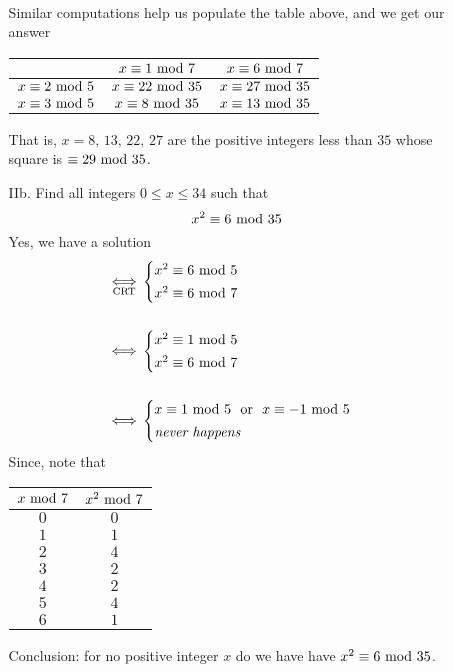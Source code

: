 \begin{itemize}[leftmargin=2em, itemsep=1.5em]
\begin{itemize}[leftmargin=*,itemsep=1.5em]
\\
Similar computations help us populate the table above, and we get our answer
\begin{center}
\begin{tabular}{|c|c|c|}
\hline
&$x\equiv 1\text{ mod }{7}$&$x\equiv 6\text{ mod }{7}$\\
\hline
$x\equiv 2\text{ mod }{5}$ & $x \equiv 22\text{ mod }{35}$& $x \equiv 27\text{ mod }{35}$\\
\hline
$x\equiv 3\text{ mod }{5}$ & $x \equiv 8\text{ mod }{35}$ & $x \equiv 13\text{ mod }{35}$\\
\hline
\end{tabular}
\end{center}
\vspace*{0.2em}
That is, $x = 8,\,13,\,22,\,27$ are the positive integers less than $35$ whose square is $\equiv 29\text{ mod }{35}$.
\item[IIb.] Find all integers $0 \leq x \leq 34$ such that
\[x^2 \equiv 6\text{ mod }{35}\]
Yes, we have a solution
\begin{align*}
\underset{\text{CRT}}{\iff}& \begin{cases} x^2 \equiv 6\text{ mod }{5}\\[0.2em] x^2\equiv 6\text{ mod }{7}\end{cases}\\[1.5em]
\iff& \begin{cases} x^2 \equiv 1\text{ mod }{5}\\[0.2em] x^2\equiv 6\text{ mod }{7}\end{cases}\\[1.5em]
\iff& \begin{cases} x \equiv 1\text{ mod }{5}\ \text{ or }\ x \equiv -1\text{ mod }{5}\\[0.2em] \text{\emph{never happens}}\end{cases}
\end{align*}
Since, note that
\begin{center}
\begin{tabular}{|c|c|}
\hline
$x\text{ mod }{7}$&$x^2\text{ mod }{7}$\\
\hline
$0$ & $0$\\
\hline
$1$ & $1$\\
\hline
$2$ & $4$\\
\hline
$3$ & $2$\\
\hline
$4$ & $2$\\
\hline
$5$ & $4$\\
\hline
$6$ & $1$\\
\hline
\end{tabular}
\end{center}
Conclusion: for no positive integer $x$ do we have have $x^2 \equiv 6\text{ mod }{35}$.
\end{itemize}
\end{itemize}

